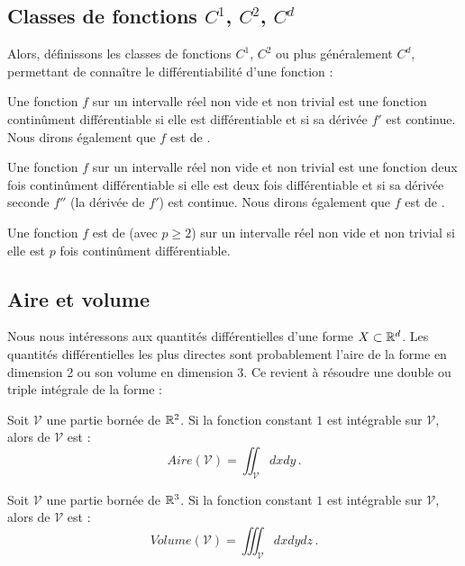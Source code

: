 \subsection{Classes de fonctions $C^1$, $C^2$, $C^d$}
%
Alors, définissons les classes de fonctions $C^1$, $C^2$ ou plus généralement
$C^d$, permettant de connaître le différentiabilité d'une fonction :
%
\begin{definition}{}
  Une fonction $f$ sur un intervalle réel non vide et non trivial est une
  fonction continûment différentiable si elle est différentiable et si sa
  dérivée $f'$ est continue. Nous dirons également que $f$ est de
  .
\end{definition}
%
\begin{definition}{}
  Une fonction $f$ sur un intervalle réel non vide et non trivial est une
  fonction deux fois continûment différentiable si elle est deux fois
  différentiable et si sa dérivée seconde $f''$ (la dérivée de $f'$) est
  continue. Nous dirons également que $f$ est de .
\end{definition}
%
\begin{definition}{}
  Une fonction $f$ est de  (avec $p \ge 2$) sur un
  intervalle réel non vide et non trivial si elle est $p$ fois continûment
  différentiable.
\end{definition}
%
\subsection{Aire et volume}
%
Nous nous intéressons aux quantités différentielles d'une forme $X \subset
\mathbb{R}^d$. Les quantités différentielles les plus directes sont probablement l'aire
de la forme en dimension 2 ou son volume en dimension 3. Ce revient à résoudre
une double ou triple intégrale de la forme :
%
\begin{definition}{}
  Soit $\mathcal{V}$ une partie bornée de $\mathbb{R}^2$. Si la fonction constant $1$
  est intégrable sur $\mathcal{V}$, alors  de $\mathcal{V}$ est :
  \begin{equation}
    \label{eq:aire}
    Aire(\mathcal{V}) = \iint_{\mathcal{V}} dxdy \,.
  \end{equation}
\end{definition}
%
\begin{definition}{}
  Soit $\mathcal{V}$ une partie bornée de $\mathbb{R}^3$. Si la fonction constant $1$
  est intégrable sur $\mathcal{V}$, alors  de $\mathcal{V}$
  est :
  \begin{equation}
    \label{eq:volume}
    Volume(\mathcal{V}) = \iiint_{\mathcal{V}} dxdydz \,.
  \end{equation}
\end{definition}
%
